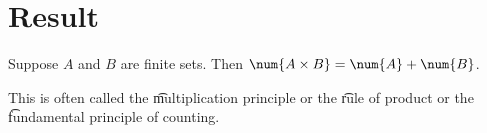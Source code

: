 
\blankpage
\section*{Result}

\begin{proposition}
Suppose $A$ and $B$ are finite sets.
Then $\num{A \times  B} = \num{A} + \num{B}$.
\end{proposition}

This is often called the \t{multiplication principle} or the \t{rule of product} or the \t{fundamental principle of counting}.
\blankpage